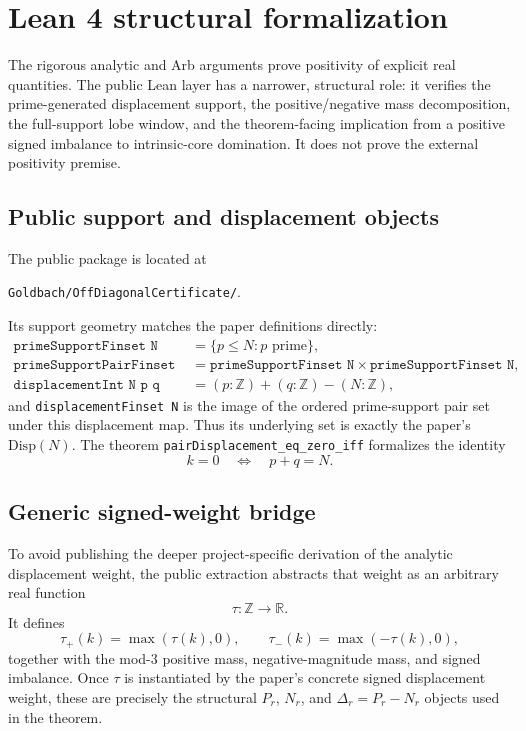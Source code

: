 \documentclass[11pt]{article}
\theoremstyle{definition}
\newcommand{\Disp}{\mathrm{Disp}}
\begin{document}
\section{Lean 4 structural formalization}\label{sec:lean}

The rigorous analytic and Arb arguments prove positivity of explicit real quantities. The public Lean layer has a narrower, structural role: it verifies the prime-generated displacement support, the positive/negative mass decomposition, the full-support lobe window, and the theorem-facing implication from a positive signed imbalance to intrinsic-core domination. It does not prove the external positivity premise.

\subsection{Public support and displacement objects}

The public package is located at
\begin{center}
\texttt{Goldbach/OffDiagonalCertificate/}.
\end{center}
Its support geometry matches the paper definitions directly:
\begin{align*}
\texttt{primeSupportFinset N}
  &=\{p\le N:p\text{ prime}\},\\
\texttt{primeSupportPairFinset N}
  &=\texttt{primeSupportFinset N}\times
    \texttt{primeSupportFinset N},\\
\texttt{displacementInt N p q}
  &=(p:\mathbb Z)+(q:\mathbb Z)-(N:\mathbb Z),
\end{align*}
and \texttt{displacementFinset N} is the image of the ordered prime-support pair set under this displacement map. Thus its underlying set is exactly the paper's $\Disp(N)$. The theorem \texttt{pairDisplacement\_eq\_zero\_iff} formalizes the identity
\[
k=0\quad\Longleftrightarrow\quad p+q=N.
\]

\subsection{Generic signed-weight bridge}

To avoid publishing the deeper project-specific derivation of the analytic displacement weight, the public extraction abstracts that weight as an arbitrary real function
\[
\tau:\mathbb Z\to\mathbb R.
\]
It defines
\[
\tau_+(k)=\max(\tau(k),0),\qquad
\tau_-(k)=\max(-\tau(k),0),
\]
together with the mod-$3$ positive mass, negative-magnitude mass, and signed imbalance. Once $\tau$ is instantiated by the paper's concrete signed displacement weight, these are precisely the structural $P_r$, $N_r$, and $\Delta_r=P_r-N_r$ objects used in the theorem.
\end{document}
